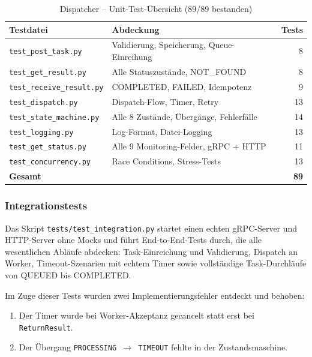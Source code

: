 \begin{table}[H]
\centering
\begin{tabular}{llr}
\toprule
\textbf{Testdatei} & \textbf{Abdeckung} & \textbf{Tests} \\
\midrule
\texttt{test\_post\_task.py}       & Validierung, Speicherung, Queue-Einreihung & 8 \\
\texttt{test\_get\_result.py}      & Alle Statuszustände, NOT\_FOUND & 8 \\
\texttt{test\_receive\_result.py}  & COMPLETED, FAILED, Idempotenz & 9 \\
\texttt{test\_dispatch.py}         & Dispatch-Flow, Timer, Retry & 13 \\
\texttt{test\_state\_machine.py}   & Alle 8 Zustände, Übergänge, Fehlerfälle & 14 \\
\texttt{test\_logging.py}          & Log-Format, Datei-Logging & 13 \\
\texttt{test\_get\_status.py}      & Alle 9 Monitoring-Felder, gRPC + HTTP & 11 \\
\texttt{test\_concurrency.py}      & Race Conditions, Stress-Tests & 13 \\
\midrule
\textbf{Gesamt}                    &                                           & \textbf{89} \\
\bottomrule
\end{tabular}
\caption{Dispatcher -- Unit-Test-Übersicht (89/89 bestanden)}
\end{table}

\subsubsection*{Integrationstests}

Das Skript \texttt{tests/test\_integration.py} startet einen echten gRPC-Server
und HTTP-Server ohne Mocks und führt End-to-End-Tests durch, die alle wesentlichen
Abläufe abdecken: Task-Einreichung und Validierung, Dispatch an Worker,
Timeout-Szenarien mit echtem Timer sowie vollständige Task-Durchläufe von
QUEUED bis COMPLETED.

Im Zuge dieser Tests wurden zwei Implementierungsfehler entdeckt und behoben:
\begin{enumerate}
  \item Der Timer wurde bei Worker-Akzeptanz gecancelt statt erst bei \texttt{ReturnResult}.
  \item Der Übergang \texttt{PROCESSING $\rightarrow$ TIMEOUT} fehlte in der Zustandsmaschine.
\end{enumerate}

